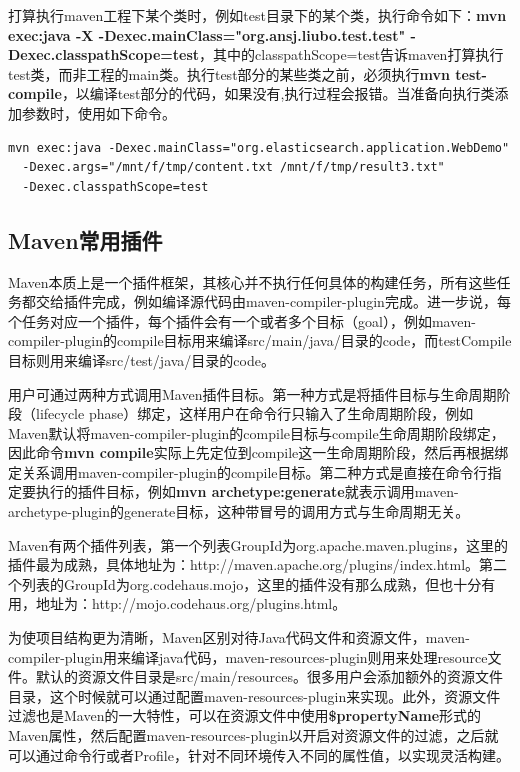 \par 打算执行maven工程下某个类时，例如test目录下的某个类，执行命令如下：\textbf{mvn exec:java -X -Dexec.mainClass="org.ansj.liubo.test.test"  -Dexec.classpathScope=test}，其中的classpathScope=test告诉maven打算执行test类，而非工程的main类。执行test部分的某些类之前，必须执行\textbf{mvn test-compile}，以编译test部分的代码，如果没有,执行过程会报错。当准备向执行类添加参数时，使用如下命令。
\begin{verbatim}
mvn exec:java -Dexec.mainClass="org.elasticsearch.application.WebDemo"
  -Dexec.args="/mnt/f/tmp/content.txt /mnt/f/tmp/result3.txt"  
  -Dexec.classpathScope=test
\end{verbatim}
\subsection{Maven常用插件}
\par Maven本质上是一个插件框架，其核心并不执行任何具体的构建任务，所有这些任务都交给插件完成，例如编译源代码由maven-compiler-plugin完成。进一步说，每个任务对应一个插件，每个插件会有一个或者多个目标（goal），例如maven-compiler-plugin的compile目标用来编译src/main/java/目录的code，而testCompile目标则用来编译src/test/java/目录的code。
\par 用户可通过两种方式调用Maven插件目标。第一种方式是将插件目标与生命周期阶段（lifecycle phase）绑定，这样用户在命令行只输入了生命周期阶段，例如Maven默认将maven-compiler-plugin的compile目标与compile生命周期阶段绑定，因此命令\textbf{mvn compile}实际上先定位到compile这一生命周期阶段，然后再根据绑定关系调用maven-compiler-plugin的compile目标。第二种方式是直接在命令行指定要执行的插件目标，例如\textbf{mvn archetype:generate}就表示调用maven-archetype-plugin的generate目标，这种带冒号的调用方式与生命周期无关。
\par Maven有两个插件列表，第一个列表GroupId为org.apache.maven.plugins，这里的插件最为成熟，具体地址为：http://maven.apache.org/plugins/index.html。第二个列表的GroupId为org.codehaus.mojo，这里的插件没有那么成熟，但也十分有用，地址为：http://mojo.codehaus.org/plugins.html。
\par 为使项目结构更为清晰，Maven区别对待Java代码文件和资源文件，maven-compiler-plugin用来编译java代码，maven-resources-plugin则用来处理resource文件。默认的资源文件目录是src/main/resources。很多用户会添加额外的资源文件目录，这个时候就可以通过配置maven-resources-plugin来实现。此外，资源文件过滤也是Maven的一大特性，可以在资源文件中使用\textbf{\${propertyName}}形式的Maven属性，然后配置maven-resources-plugin以开启对资源文件的过滤，之后就可以通过命令行或者Profile，针对不同环境传入不同的属性值，以实现灵活构建。
